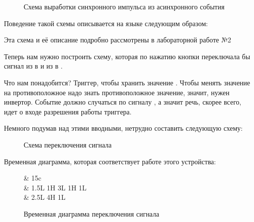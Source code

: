 {\begin{figure}[H]
	\centering
	\def\svgwidth{\columnwidth}
	
	\caption{Схема выработки синхронного импульса из асинхронного события}
\end{figure}

\par{Поведение такой схемы описывается на языке  следующим образом:}



\par{Эта схема и её описание подробно рассмотрены в лабораторной работе №2}

\par{Теперь нам нужно построить схему, которая по нажатию кнопки переключала бы сигнал  из  в  и из  в .}

\par{Что нам понадобится? Триггер, чтобы хранить значение . Чтобы менять значение на противоположное надо знать противоположное значение, значит, нужен инвертор. Событие должно случаться по сигналу , а значит речь, скорее всего, идет о входе разрешения работы триггера.}

\par{Немного подумав над этими вводными, нетрудно составить следующую схему:}

\begin{figure}[H]
	\centering
	\def\svgwidth{\columnwidth}
	
	\caption{Схема переключения сигнала }
\end{figure}

\par{Временная диаграмма, которая соответствует работе этого устройства:}

\begin{figure}[H]
\centering
\begin{tikztimingtable}[%
    timing/dslope=0.1,
    timing/.style={x=5ex,y=2ex},
    very thick,
    x=3ex,
    timing/rowdist=3.3ex,
    timing/name/.style={font=\sffamily\scriptsize},
]
					& 15{c} \\
		& 1.5L 1H 3L 1H 1L\\
			& 2.5L 4H 1L\\
\extracode
\end{tikztimingtable}
\caption{Временная диаграмма переключения сигнала }
\end{figure}

}
